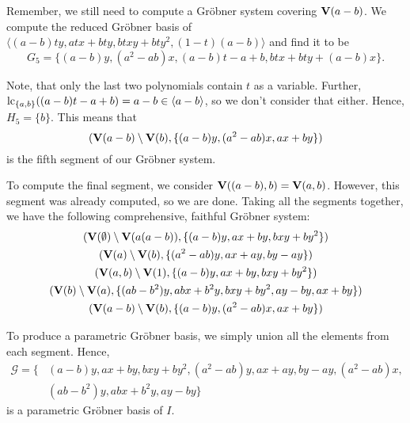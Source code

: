 \begin{example}
  Remember, we still need to compute a Gröbner system covering $\operatorname{\mathbf V}(a - b)$. We compute the reduced Gröbner basis of $\langle (a - b)ty, atx + bty, btxy + bty^{2}, (1 - t)(a - b) \rangle$ and find it to be
  \[G_{5} = \{ (a - b)y, (a^2 - ab)x, (a - b)t - a + b, btx + bty + (a - b)x \}.\]

  Note, that only the last two polynomials contain $t$ as a variable. Further, $\operatorname{lc}_{\{a, b\}}((a - b)t - a + b) = a - b \in \langle a - b \rangle$, so we don't consider that either. Hence, $H_{5} = \{b\}$. This means that
  \[(\operatorname{\mathbf V}(a - b) \setminus \operatorname{\mathbf V}(b), \{(a - b)y, (a^2 - ab)x, ax + by \})\]
  is the fifth segment of our Gröbner system.

  To compute the final segment, we consider $\operatorname{\mathbf V}((a - b), b) = \operatorname{\mathbf V}(a, b)$. However, this segment was already computed, so we are done. Taking all the segments together, we have the following comprehensive, faithful Gröbner system:
  \begin{gather*}
    (\operatorname{\mathbf V}(\emptyset) \setminus \operatorname{\mathbf V}(a(a - b)), \{(a - b)y, ax + by, bxy + by^{2}\}) \\
    (\operatorname{\mathbf V}(a) \setminus \operatorname{\mathbf V}(b),\{(a^2 - ab)y, ax + ay, by - ay\} )  \\
    (\operatorname{\mathbf V}(a, b) \setminus \operatorname{\mathbf V}(1), \{(a - b)y, ax + by, bxy + by^2\}) \\
    (\operatorname{\mathbf V}(b) \setminus \operatorname{\mathbf V}(a), \{(ab - b^{2})y, abx + b^{2}y, bxy + by^{2}, ay - by, ax + by\}) \\
    (\operatorname{\mathbf V}(a - b) \setminus \operatorname{\mathbf V}(b), \{(a - b)y, (a^2 - ab)x, ax + by \})
  \end{gather*}

  To produce a parametric Gröbner basis, we simply union all the elements from each segment. Hence,
  \begin{align*}
    \mathcal G = \{&(a - b)y, ax + by, bxy + by^{2}, (a^{2} - ab)y, ax + ay, by - ay, (a^{2} - ab)x, \\
                   &(ab - b^{2})y, abx + b^{2}y, ay - by \}
  \end{align*}
  is a parametric Gröbner basis of $I$.

\end{example}

